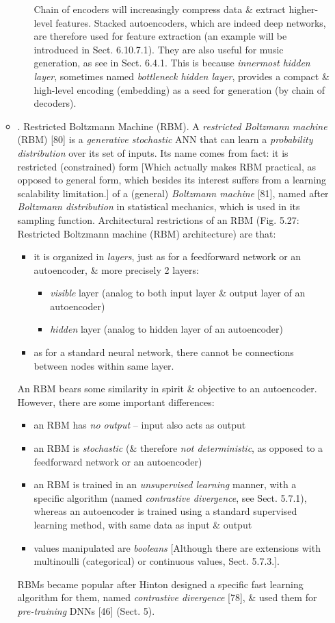 \documentclass{article}
\begin{document}
\begin{itemize}
\begin{itemize}
\begin{itemize}
			Chain of encoders will increasingly compress data \& extract higher-level features. Stacked autoencoders, which are indeed deep networks, are therefore used for feature extraction (an example will be introduced in Sect. 6.10.7.1). They are also useful for music generation, as see in Sect. 6.4.1. This is because {\it innermost hidden layer}, sometimes named {\it bottleneck hidden layer}, provides a compact \& high-level encoding (embedding) as a seed for generation (by chain of decoders).
		\end{itemize}
		\item {. Restricted Boltzmann Machine (RBM).} A {\it restricted Boltzmann machine} (RBM) [80] is a {\it generative stochastic} ANN that can learn a {\it probability distribution} over its set of inputs. Its name comes from fact: it is restricted (constrained) form [Which actually makes RBM practical, as opposed to general form, which besides its interest suffers from a learning scalability limitation.] of a (general) {\it Boltzmann machine} [81], named after {\it Boltzmann distribution} in statistical mechanics, which is used in its sampling function. Architectural restrictions of an RBM ({\sf Fig. 5.27: Restricted Boltzmann machine (RBM) architecture}) are that:
		\begin{itemize}
			\item it is organized in {\it layers}, just as for a feedforward network or an autoencoder, \& more precisely 2 layers:
			\begin{itemize}
				\item {\it visible} layer (analog to both input layer \& output layer of an autoencoder)
				\item {\it hidden} layer (analog to hidden layer of an autoencoder)
			\end{itemize}
			\item as for a standard neural network, there cannot be connections between nodes within same layer.
		\end{itemize}
		An RBM bears some similarity in spirit \& objective to an autoencoder. However, there are some important differences:
		\begin{itemize}
			\item an RBM has {\it no output} -- input also acts as output
			\item an RBM is {\it stochastic} (\& therefore {\it not deterministic}, as opposed to a feedforward network or an autoencoder)
			\item an RBM is trained in an {\it unsupervised learning} manner, with a specific algorithm (named {\it contrastive divergence}, see Sect. 5.7.1), whereas an autoencoder is trained using a standard supervised learning method, with same data as input \& output
			\item values manipulated are {\it booleans} [Although there are extensions with multinoulli (categorical) or continuous values, Sect. 5.7.3.].
		\end{itemize}
		RBMs became popular after {\sc Hinton} designed a specific fast learning algorithm for them, named {\it contrastive divergence} [78], \& used them for {\it pre-training} DNNs [46] (Sect. 5).


\end{itemize}
\end{itemize}
\end{document}
